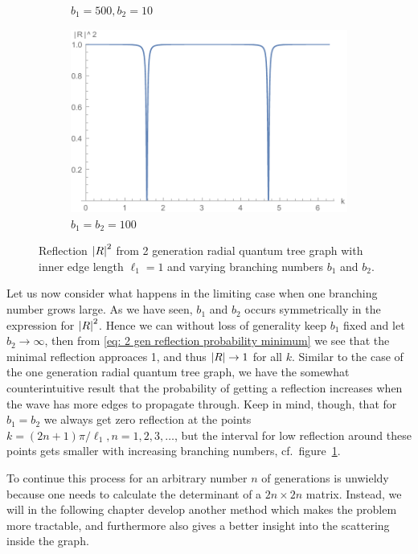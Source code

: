 \begin{figure}[h]
\begin{subfigure}[t]{0.5\textwidth}
    \caption{$b_1=500, b_2=10$}
  \end{subfigure}
  \begin{subfigure}[t]{0.5\textwidth}
    \includegraphics[width=1\textwidth]{img/2gen_reflection_l=1_b1=100_b2=100}
    \caption{$b_1=b_2=100$}
    \label{fig: 2 gen reflection gap}
  \end{subfigure}
  \caption{Reflection $\left\lvert R\right\rvert^2$ from 2 generation radial quantum tree graph with inner edge length $\ell_1=1$ and varying branching numbers $b_1$ and $b_2$.}
  \label{fig: 2 gen reflection}
\end{figure}

Let us now consider what happens in the limiting case when one branching number grows large. As we have seen, $b_1$ and $b_2$ occurs symmetrically in the expression for $\left\lvert R\right\rvert^2$. Hence we can without loss of generality keep $b_1$ fixed and let $b_2 \to \infty$, then from \eqref{eq: 2 gen reflection probability minimum} we see that the minimal reflection approaces 1, and thus $\left\lvert R\right\rvert \to 1$ for all $k$. Similar to the case of the one generation radial quantum tree graph, we have the somewhat counterintuitive result that the probability of getting a reflection increases when the wave has more edges to propagate through. Keep in mind, though, that for $b_1 = b_2$ we always get zero reflection at the points $k = (2n+1)\pi/\ell_1, n = 1,2,3,\ldots$, but the interval for low reflection around these points gets smaller with increasing branching numbers, cf.\ figure~\ref{fig: 2 gen reflection gap}.

To continue this process for an arbitrary number $n$ of generations is unwieldy because one needs to calculate the determinant of a $2n \times 2n$ matrix. Instead, we will in the following chapter develop another method which makes the problem more tractable, and furthermore also gives a better insight into the scattering inside the graph.



